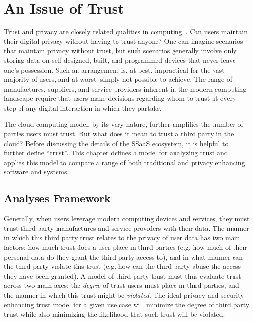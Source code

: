 \chapter{An Issue of Trust}
\label{chap:trust}

Trust and privacy are closely related qualities in
computing~\cite{flowerday2006}. Can users maintain their digital
privacy without having to trust anyone? One can imagine scenarios that
maintain privacy without trust, but such scenarios generally involve
only storing data on self-designed, built, and programmed devices that
never leave one's possession. Such an arrangement is, at best,
impractical for the vast majority of users, and at worst, simply not
possible to achieve. The range of manufactures, suppliers, and service
providers inherent in the modern computing landscape require that
users make decisions regarding whom to trust at every step of any
digital interaction in which they partake.

The cloud computing model, by its very nature, further amplifies the
number of parties users must trust. But what does it mean to trust a
third party in the cloud? Before discussing the details of the SSaaS
ecosystem, it is helpful to further define ``trust''. This chapter
defines a model for analyzing trust and applies this model to compare
a range of both traditional and privacy enhancing software and
systems.

\section{Analyses Framework}
\label{chap:trust:framework}

Generally, when users leverage modern computing devices and services,
they must trust third party manufactures and service providers with
their data. The manner in which this third party trust relates to the
privacy of user data has two main factors: how much trust does a user
place in third parties (e.g. how much of their personal data do they
grant the third party access to), and in what manner can the third
party violate this trust (e.g. how can the third party abuse the
access they have been granted). A model of third party trust must thus
evaluate trust across two main axes: the \emph{degree} of trust users
must place in third parties, and the manner in which this trust might
be \emph{violated}. The ideal privacy and security enhancing trust
model for a given use case will minimize the degree of third party
trust while also minimizing the likelihood that such trust will be
violated.

